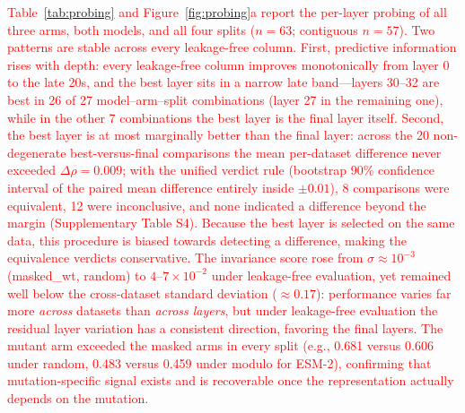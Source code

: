 \documentclass[numbered,webpdf,modern,large]{oup-authoring-template}
\newcommand{\rev}[1]{\textcolor{red}{#1}}
\begin{document}
\rev{Table~\ref{tab:probing} and Figure~\ref{fig:probing}a report the per-layer
probing of all three arms,
both models, and all four splits ($n = 63$; contiguous $n = 57$). Two patterns are
stable across every leakage-free column. First, predictive information rises
with depth: every leakage-free column improves monotonically from layer 0 to
the late 20s, and the best layer sits in a narrow late
band---layers 30--32 are best in 26 of 27 model--arm--split combinations (layer
27 in the remaining one), while in the other 7 combinations the best layer is
the final layer itself. Second, the best layer is at most marginally better than
the final layer: across the 20 non-degenerate best-versus-final comparisons the
mean per-dataset difference never exceeded $\Delta\rho = 0.009$; with the
unified verdict rule (bootstrap 90\% confidence interval of the paired mean
difference entirely inside $\pm 0.01$), 8 comparisons were equivalent, 12 were
inconclusive, and none indicated a difference beyond the margin (Supplementary
Table S4). Because the best layer is selected on the same data, this procedure
is biased towards detecting a difference, making the equivalence verdicts
conservative. The
invariance score rose from $\sigma \approx 10^{-3}$ (masked\_wt, random) to
$4$--$7 \times 10^{-2}$ under leakage-free evaluation, yet remained well below the
cross-dataset standard deviation ($\approx 0.17$): performance varies far more
\emph{across} datasets than \emph{across layers}, but under leakage-free evaluation
the residual layer variation has a consistent direction, favoring the final layers.
The mutant arm exceeded the masked arms in every split (e.g., 0.681 versus 0.606
under random, 0.483 versus 0.459 under modulo for ESM-2), confirming that
mutation-specific signal exists and is recoverable once the representation actually
depends on the mutation.}
\end{document}
